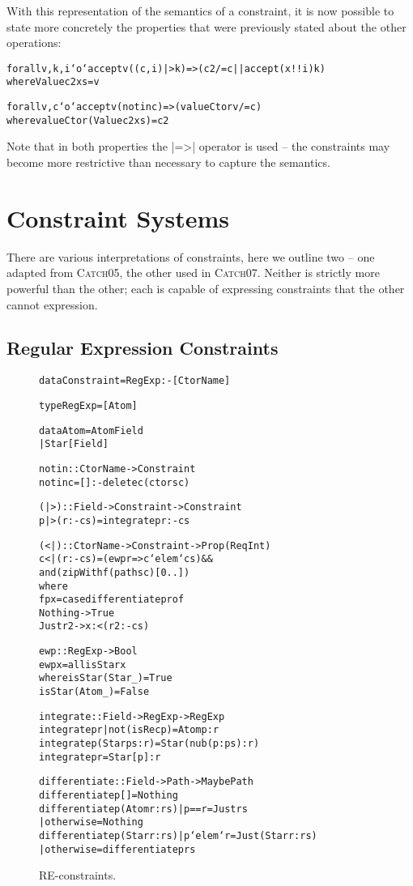 \documentclass[preprint]{sigplanconf}
\newcommand{\catch}{\textsc{Catch}}
\newenvironment{code}{\begin{alltt}\small}{\end{alltt}}
\begin{document}
With this representation of the semantics of a constraint, it is now possible to state more concretely the properties that were previously stated about the other operations:

\begin{code}
forall v, k, i `o` accept v ((c,i) |> k) => (c2 /= c || accept (x !! i) k)
    where Value c2 xs = v

forall v, c `o` accept v (notin c) => (valueCtor v /= c)
    where valueCtor (Value c2 xs) = c2
\end{code}

Note that in both properties the |=>| operator is used -- the constraints may become more restrictive than necessary to capture the semantics.

\section{Constraint Systems}
\label{sec:constraint}

There are various interpretations of constraints, here we outline two -- one adapted from \catch05, the other used in \catch07. Neither is strictly more powerful than the other; each is capable of expressing constraints that the other cannot expression.

\subsection{Regular Expression Constraints}
\label{sec:regexp}

\begin{figure}
\begin{code}
data Constraint = RegExp :- [CtorName]

type RegExp = [Atom]

data Atom  =  Atom  Field
           |  Star  [Field]

notin :: CtorName -> Constraint
notin c = [] :- delete c (ctors c)

(|>) :: Field -> Constraint -> Constraint
p |> (r :- cs) = integrate p r :- cs

(<|) :: CtorName -> Constraint -> Prop (Req Int)
c <| (r :- cs) = (ewp r => c `elem` cs) &&
    and (zipWith f (paths c) [0..])
    where
    f p x = case  differentiate p r of
                  Nothing -> True
                  Just r2 -> x :< (r2 :- cs)

ewp :: RegExp -> Bool
ewp x = all isStar x
   where  isStar (Star  _) = True
          isStar (Atom  _) = False

integrate :: Field -> RegExp -> RegExp
integrate p r | not (isRec p) = Atom p : r
integrate p (Star ps:r) = Star (nub (p:ps) : r)
integrate p r = Star [p] : r

differentiate :: Field -> Path -> Maybe Path
differentiate p [] = Nothing
differentiate p (Atom  r:rs)  | p == r     = Just rs
                              | otherwise  = Nothing
differentiate p (Star  r:rs)  | p `elem` r  = Just (Star r:rs)
                              | otherwise   = differentiate p rs
\end{code}
\caption{RE-constraints.}
\label{fig:regexp}
\end{figure}
\end{document}
